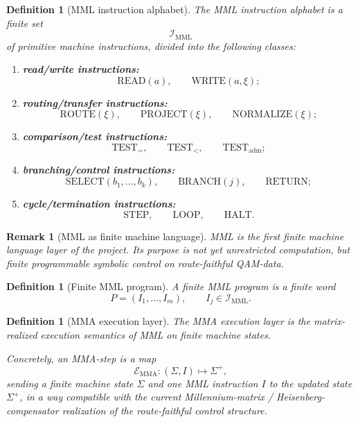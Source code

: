 \documentclass[12pt,a4paper]{article}
\newtheorem{definition}[theorem]{Definition}
\newtheorem{remark}[theorem]{Remark}
\begin{document}
\begin{definition}[MML instruction alphabet]\label{def:mml-instruction-alphabet-computational-layer}
The \emph{MML instruction alphabet} is a finite set
\[
\mathcal{I}_{\mathrm{MML}}
\]
of primitive machine instructions, divided into the following classes:
\begin{enumerate}[leftmargin=2em]
 \item \textbf{read/write instructions:}
 \[
 \mathrm{READ}(a),\qquad \mathrm{WRITE}(a,\xi);
 \]
 \item \textbf{routing/transfer instructions:}
 \[
 \mathrm{ROUTE}(\xi),\qquad \mathrm{PROJECT}(\xi),\qquad \mathrm{NORMALIZE}(\xi);
 \]
 \item \textbf{comparison/test instructions:}
 \[
 \mathrm{TEST}_{=},\qquad \mathrm{TEST}_{<},\qquad \mathrm{TEST}_{\mathrm{adm}};
 \]
 \item \textbf{branching/control instructions:}
 \[
 \mathrm{SELECT}(b_1,\dots,b_k),\qquad \mathrm{BRANCH}(j),\qquad \mathrm{RETURN};
 \]
 \item \textbf{cycle/termination instructions:}
 \[
 \mathrm{STEP},\qquad \mathrm{LOOP},\qquad \mathrm{HALT}.
 \]
\end{enumerate}
\end{definition}

\begin{remark}[MML as finite machine language]\label{rem:mml-as-finite-machine-language-computational-layer}
MML is the first finite machine language layer of the project. Its purpose is not yet unrestricted computation, but finite programmable symbolic control on route-faithful QAM-data.
\end{remark}

\begin{definition}[Finite MML program]\label{def:finite-mml-program-computational-layer}
A \emph{finite MML program} is a finite word
\[
P=(I_1,\dots,I_m),\qquad I_j\in\mathcal{I}_{\mathrm{MML}}.
\]
\end{definition}

\begin{definition}[MMA execution layer]\label{def:mma-execution-layer-computational-layer}
The \emph{MMA execution layer} is the matrix-realized execution semantics of MML on finite machine states.

Concretely, an MMA-step is a map
\[
\mathcal{E}_{\mathrm{MMA}}:(\Sigma,I)\longmapsto \Sigma^{+},
\]
sending a finite machine state \(\Sigma\) and one MML instruction \(I\) to the updated state \(\Sigma^{+}\), in a way compatible with the current Millennium-matrix / Heisenberg-compensator realization of the route-faithful control structure.
\end{definition}
\end{document}
